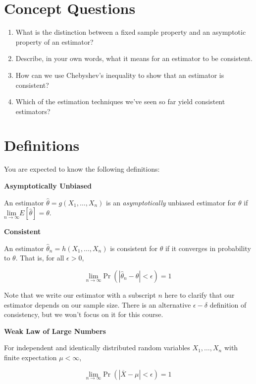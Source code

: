 \documentclass[
  letterpaper,
  DIV=11,
  numbers=noendperiod]{scrreprt}
\begin{document}
\section{Concept Questions}\label{concept-questions-4}

\begin{enumerate}
\def\labelenumi{\arabic{enumi}.}
\item
  What is the distinction between a fixed sample property and an
  asymptotic property of an estimator?
\item
  Describe, in your own words, what it means for an estimator to be
  consistent.
\item
  How can we use Chebyshev's inequality to show that an estimator is
  consistent?
\item
  Which of the estimation techniques we've seen so far yield consistent
  estimators?
\end{enumerate}

\section{Definitions}\label{definitions-4}

You are expected to know the following definitions:

\textbf{Asymptotically Unbiased}

An estimator \(\hat{\theta} = g(X_1, \dots, X_n)\) is an
\emph{asymptotically} unbiased estimator for \(\theta\) if
\(\underset{n \to \infty}{\text{lim}} E[\hat{\theta}] = \theta\).

\textbf{Consistent}

An estimator \(\hat{\theta}_n = h(X_1, \dots, X_n)\) is consistent for
\(\theta\) if it converges in probability to \(\theta\). That is, for
all \(\epsilon > 0\),

\[
\underset{n \to \infty}{\text{lim}} \Pr(| \hat{\theta}_n - \theta | < \epsilon) = 1
\]

Note that we write our estimator with a subscript \(n\) here to clarify
that our estimator depends on our sample size. There is an alternative
\(\epsilon-\delta\) definition of consistency, but we won't focus on it
for this course.

\textbf{Weak Law of Large Numbers}

For independent and identically distributed random variables
\(X_1, \dots, X_n\) with finite expectation \(\mu < \infty\),

\[
\underset{n \to \infty}{\text{lim}} \Pr(| \overline{X} - \mu | < \epsilon) = 1
\]
\end{document}
